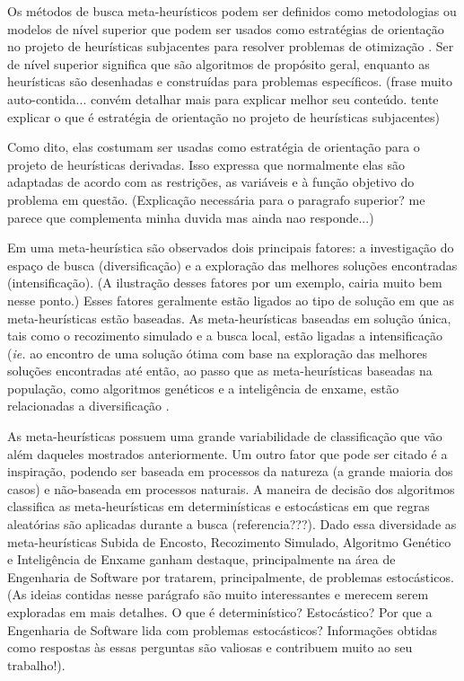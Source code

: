 Os métodos de busca meta-heurísticos podem ser definidos como metodologias ou modelos de nível superior que podem ser usados como estratégias de orientação no projeto de heurísticas subjacentes para resolver problemas de otimização \cite{talbi2009metaheuristics}. Ser de nível superior significa que são algoritmos de propósito geral, enquanto as heurísticas são desenhadas e construídas para  problemas específicos. (frase muito auto-contida... convém detalhar mais para explicar melhor seu conteúdo. tente explicar o que é estratégia de orientação no projeto de heurísticas subjacentes)

Como dito, elas costumam ser usadas como estratégia de orientação para o projeto de heurísticas derivadas. Isso expressa que normalmente elas são adaptadas de acordo com as restrições, as variáveis e à função objetivo do problema em questão. (Explicação necessária para o paragrafo superior? me parece que complementa minha duvida mas ainda nao responde...)

Em uma meta-heurística são observados dois principais fatores: a investigação do espaço de busca (diversificação) e a exploração das melhores soluções encontradas (intensificação). (A ilustração desses fatores por um exemplo, cairia muito bem nesse ponto.) Esses fatores geralmente estão ligados ao tipo de solução em que as meta-heurísticas estão baseadas. As meta-heurísticas baseadas em solução única, tais como o recozimento simulado e a busca local, estão ligadas a intensificação (\textit{ie.} ao encontro de uma solução ótima com base na exploração das melhores soluções encontradas até então, ao passo que as meta-heurísticas baseadas na população, como algoritmos genéticos e a inteligência de enxame, estão relacionadas a diversificação \cite{talbi2009metaheuristics}.

As meta-heurísticas possuem uma grande variabilidade de classificação que vão além daqueles mostrados anteriormente. Um outro fator que pode ser citado é a inspiração, podendo ser baseada em processos da natureza (a grande maioria dos casos) e não-baseada em processos naturais. A maneira de decisão dos algoritmos classifica as meta-heurísticas em determinísticas e estocásticas em que regras aleatórias são aplicadas durante a busca (referencia???). Dado essa diversidade as meta-heurísticas Subida de Encosto, Recozimento Simulado,  Algoritmo Genético e Inteligência de Enxame ganham destaque, principalmente na área de Engenharia de Software \cite{khari2017extensive} por tratarem, principalmente, de problemas estocásticos. (As ideias contidas nesse parágrafo são muito interessantes e merecem serem exploradas em mais detalhes. O que é determinístico? Estocástico?  Por que a Engenharia de Software lida com problemas estocásticos? Informações obtidas como respostas às essas perguntas são valiosas e contribuem muito ao seu trabalho!).


